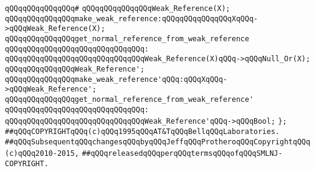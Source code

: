 \verb|qQQqqQQqqQQqqQQq#|\newline
\verb|qQQqqQQqqQQqqQQqWeak_Reference(X);|\newline
\newline
\verb|qQQqqQQqqQQqqQQqmake_weak_reference:qQQqqQQqqQQqqQQqXqQQq->qQQqWeak_Reference(X);|\newline
\newline
\verb|qQQqqQQqqQQqqQQqget_normal_reference_from_weak_reference|\newline
\verb|qQQqqQQqqQQqqQQqqQQqqQQqqQQqqQQq:|\newline
\verb|qQQqqQQqqQQqqQQqqQQqqQQqqQQqqQQqWeak_Reference(X)qQQq->qQQqNull_Or(X);|\newline
\newline
\verb|qQQqqQQqqQQqqQQqWeak_Reference';|\newline
\newline
\verb|qQQqqQQqqQQqqQQqmake_weak_reference'qQQq:qQQqXqQQq->qQQqWeak_Reference';|\newline
\newline
\verb|qQQqqQQqqQQqqQQqget_normal_reference_from_weak_reference'|\newline
\verb|qQQqqQQqqQQqqQQqqQQqqQQqqQQqqQQq:|\newline
\verb|qQQqqQQqqQQqqQQqqQQqqQQqqQQqqQQqWeak_Reference'qQQq->qQQqBool;|\newline
\verb|};|\newline
\newline
\newline
\newline
\verb|##qQQqCOPYRIGHTqQQq(c)qQQq1995qQQqAT&TqQQqBellqQQqLaboratories.|\newline
\verb|##qQQqSubsequentqQQqchangesqQQqbyqQQqJeffqQQqProtheroqQQqCopyrightqQQq(c)qQQq2010-2015,|\newline
\verb|##qQQqreleasedqQQqperqQQqtermsqQQqofqQQqSMLNJ-COPYRIGHT.|\newline

